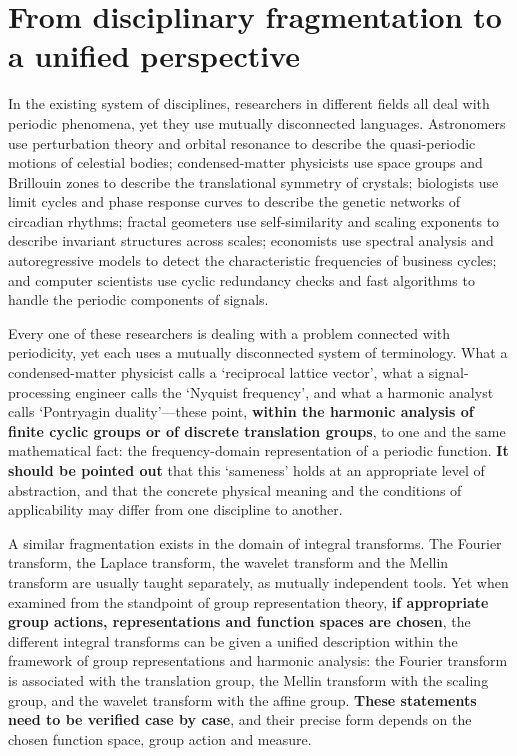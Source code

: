 \section*{From disciplinary fragmentation to a unified perspective}

In the existing system of disciplines, researchers in different fields all deal with periodic phenomena, yet they use mutually disconnected languages. Astronomers use perturbation theory and orbital resonance to describe the quasi-periodic motions of celestial bodies; condensed-matter physicists use space groups and Brillouin zones to describe the translational symmetry of crystals; biologists use limit cycles and phase response curves to describe the genetic networks of circadian rhythms; fractal geometers use self-similarity and scaling exponents to describe invariant structures across scales; economists use spectral analysis and autoregressive models to detect the characteristic frequencies of business cycles; and computer scientists use cyclic redundancy checks and fast algorithms to handle the periodic components of signals.

Every one of these researchers is dealing with a problem connected with periodicity, yet each uses a mutually disconnected system of terminology. What a condensed-matter physicist calls a `reciprocal lattice vector', what a signal-processing engineer calls the `Nyquist frequency', and what a harmonic analyst calls `Pontryagin duality'---these point, \textbf{within the harmonic analysis of finite cyclic groups or of discrete translation groups}, to one and the same mathematical fact: the frequency-domain representation of a periodic function. \textbf{It should be pointed out} that this `sameness' holds at an appropriate level of abstraction, and that the concrete physical meaning and the conditions of applicability may differ from one discipline to another.

A similar fragmentation exists in the domain of integral transforms. The Fourier transform, the Laplace transform, the wavelet transform and the Mellin transform are usually taught separately, as mutually independent tools. Yet when examined from the standpoint of group representation theory, \textbf{if appropriate group actions, representations and function spaces are chosen}, the different integral transforms can be given a unified description within the framework of group representations and harmonic analysis: the Fourier transform is associated with the translation group, the Mellin transform with the scaling group, and the wavelet transform with the affine group. \textbf{These statements need to be verified case by case}, and their precise form depends on the chosen function space, group action and measure.

